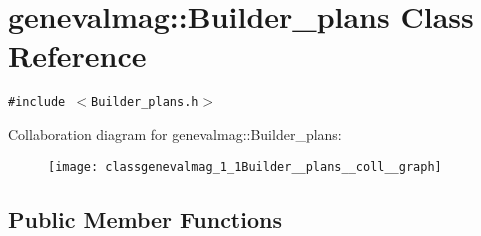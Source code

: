\hypertarget{classgenevalmag_1_1Builder__plans}{
\section{genevalmag::Builder\_\-plans Class Reference}
\label{classgenevalmag_1_1Builder__plans}
}
{\tt \#include $<$Builder\_\-plans.h$>$}

Collaboration diagram for genevalmag::Builder\_\-plans:\nopagebreak
\begin{figure}[H]
\begin{center}
\leavevmode
\texttt{[image: classgenevalmag\_1\_1Builder\_\_plans\_\_coll\_\_graph]}
\end{center}
\end{figure}
\subsection*{Public Member Functions}
